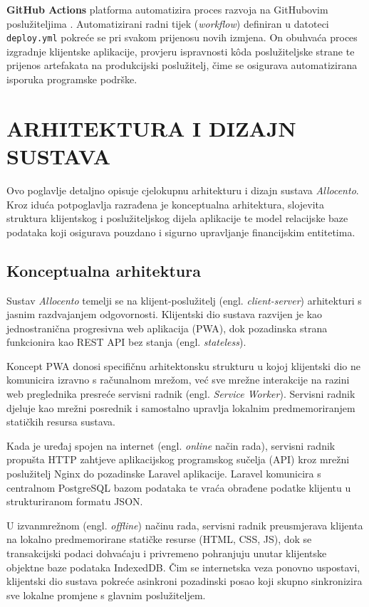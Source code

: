 \documentclass[a4paper,12pt,oneside]{article}
\begin{document}
	\textbf{GitHub Actions} platforma automatizira proces razvoja na GitHubovim poslužiteljima \cite{w_github_actions}. Automatizirani radni tijek (\textit{workflow}) definiran u datoteci \texttt{deploy.yml} pokreće se pri svakom prijenosu novih izmjena. On obuhvaća proces izgradnje klijentske aplikacije, provjeru ispravnosti kôda poslužiteljske strane te prijenos artefakata na produkcijski poslužitelj, čime se osigurava automatizirana isporuka programske podrške.
	
	\newpage
	
	\section{ARHITEKTURA I DIZAJN SUSTAVA}
	
	Ovo poglavlje detaljno opisuje cjelokupnu arhitekturu i dizajn sustava \textit{Allocento}. Kroz iduća potpoglavlja razrađena je konceptualna arhitektura, slojevita struktura klijentskog i poslužiteljskog dijela aplikacije te model relacijske baze podataka koji osigurava pouzdano i sigurno upravljanje financijskim entitetima.
	
	\subsection{Konceptualna arhitektura}
		
	Sustav \textit{Allocento} temelji se na klijent-poslužitelj (engl. \textit{client-server}) arhitekturi s jasnim razdvajanjem odgovornosti. Klijentski dio sustava razvijen je kao jednostranična progresivna web aplikacija (PWA), dok pozadinska strana funkcionira kao REST API bez stanja (engl. \textit{stateless}).
	
	Koncept PWA donosi specifičnu arhitektonsku strukturu u kojoj klijentski dio ne komunicira izravno s računalnom mrežom, već sve mrežne interakcije na razini web preglednika presreće servisni radnik (engl. \textit{Service Worker}). Servisni radnik djeluje kao mrežni posrednik i samostalno upravlja lokalnim predmemoriranjem statičkih resursa sustava.
	
	Kada je uređaj spojen na internet (engl. \textit{online} način rada), servisni radnik propušta HTTP zahtjeve aplikacijskog programskog sučelja (API) kroz mrežni poslužitelj Nginx do pozadinske Laravel aplikacije. Laravel komunicira s centralnom PostgreSQL bazom podataka te vraća obrađene podatke klijentu u strukturiranom formatu JSON.
	
	U izvanmrežnom (engl. \textit{offline}) načinu rada, servisni radnik preusmjerava klijenta na lokalno predmemorirane statičke resurse (HTML, CSS, JS), dok se transakcijski podaci dohvaćaju i privremeno pohranjuju unutar klijentske objektne baze podataka IndexedDB. Čim se internetska veza ponovno uspostavi, klijentski dio sustava pokreće asinkroni pozadinski posao koji skupno sinkronizira sve lokalne promjene s glavnim poslužiteljem.
\end{document}
